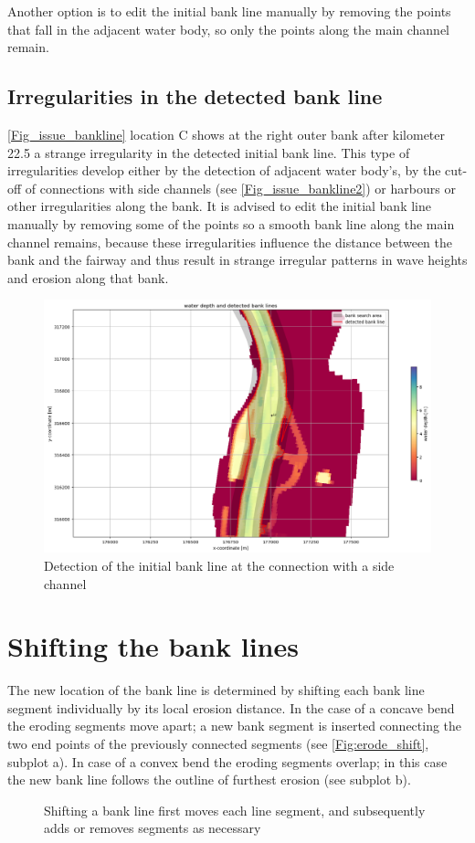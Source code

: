 Another option is to edit the initial bank line manually by removing the points that fall in the adjacent water body, so only the points along the main channel remain.

\subsection{Irregularities in the detected bank line}
\autoref{Fig_issue_bankline} location C shows at the right outer bank after kilometer 22.5 a strange irregularity in the detected initial bank line.
This type of irregularities develop either by the detection of adjacent water body's, by the cut-off of connections with side channels (see \autoref{Fig_issue_bankline2}) or harbours or other irregularities along the bank.
It is advised to edit the initial bank line manually by removing some of the points so a smooth bank line along the main channel remains, because these irregularities influence the distance between the bank and the fairway and thus result in strange irregular patterns in wave heights and erosion along that bank.

\begin{figure}[!h]
	\includegraphics[width=\textwidth]{figures/detection_issue2.png}
	\caption{Detection of the initial bank line at the connection with a side channel}
	\label{Fig_issue_bankline2}
\end{figure}

\section{Shifting the bank lines} \label{Sec:BankShift}

The new location of the bank line is determined by shifting each bank line segment individually by its local erosion distance.
In the case of a concave bend the eroding segments move apart; a new bank segment is inserted connecting the two end points of the previously connected segments (see \autoref{Fig:erode_shift}, subplot a).
In case of a convex bend the eroding segments overlap; in this case the new bank line follows the outline of furthest erosion (see subplot b).

\begin{figure}[!h]
\center
\resizebox{12cm}{!}{
   
}
\caption{Shifting a bank line first moves each line segment, and subsequently adds or removes segments as necessary}
\label{Fig:erode_shift}
\end{figure}
